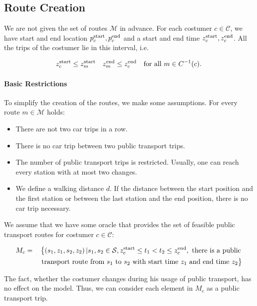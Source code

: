 \subsection{Route Creation}

We are not given the set of routes $\mathcal{M}$ in advance. For each costumer $c\in\mathcal{C}$, we have start and end location $p^{\operatorname{start}}_c, p^{\operatorname{end}}_c$ and a start and end time $z^{\operatorname{start}}_c, z^{\operatorname{end}}_c$. All the trips of the costumer lie in this interval, i.e.

\begin{align*}
	z^{\operatorname{start}}_c \leq z^{\operatorname{start}}_m && z^{\operatorname{end}}_m \leq z^{\operatorname{end}}_c && \text{for all } m\in C^{-1}(c).
\end{align*}

\paragraph{Basic Restrictions} \parfill

To simplify the creation of the routes, we make some assumptions. For every route $m\in\mathcal{M}$ holds:

\begin{itemize}
	\item{There are not two car trips in a row.}
	\item{There is no car trip between two public transport trips.}
	\item{The number of public transport trips is restricted. Usually, one can reach every station with at most two changes.}
	\item{We define a walking distance $d$. If the distance between the start position and the first station or between the last station and the end position, there is no car trip necessary.}
\end{itemize}

We assume that we have some oracle that provides the set of feasible public transport routes for costumer $c\in\mathcal{C}$:

\begin{align*}
	M_c & = && \left\{\left(s_1,z_1,s_2,z_2\right)|s_1,s_2\in\mathcal{S}, \zstart_c\leq t_1 < t_2 \leq \zend_c, \text{ there is a public} \right. \\
	&&& \left.\vphantom{\zstart}\text{transport route from $s_1$ to $s_2$ with start time $z_1$ and end time $z_2$}\right\}
\end{align*}

The fact, whether the costumer changes during his usage of public transport, has no effect on the model. Thus, we can consider each element in $M_c$ as a public transport trip.

